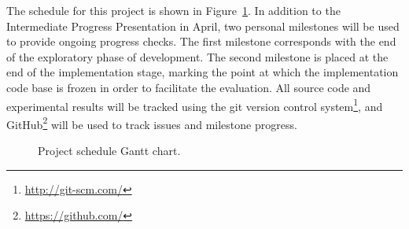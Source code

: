 The schedule for this project is shown in Figure~\ref{fig:gantt}. In
addition to the Intermediate Progress Presentation in April, two
personal milestones will be used to provide ongoing progress
checks. The first milestone corresponds with the end of the
exploratory phase of development. The second milestone is placed at
the end of the implementation stage, marking the point at which the
implementation code base is frozen in order to facilitate the
evaluation. All source code and experimental results will be tracked
using the git version control
system\footnote{\url{http://git-scm.com/}}, and
GitHub\footnote{\url{https://github.com/}} will be used to track
issues and milestone progress.

\begin{figure}[H]
\makebox[\textwidth][c]{}
\caption{Project schedule Gantt chart.}
\label{fig:gantt}
\end{figure}
